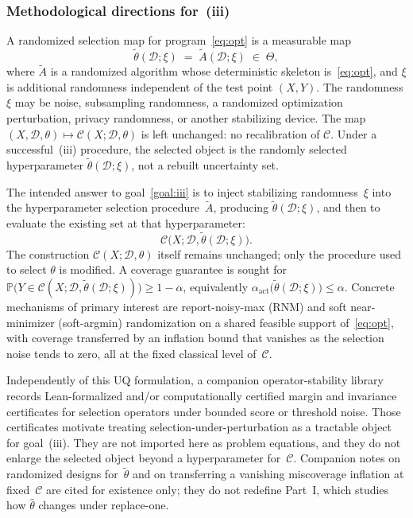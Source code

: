 \documentclass[12pt]{article}
\theoremstyle{plain}
\begin{document}
\subsubsection{Methodological directions for~(iii)}
\label{sec:methods}

\label{def:thetatilde}
A randomized selection map for program~\eqref{eq:opt} is a measurable map
\[
\widetilde\theta(\mathcal{D};\xi)
\;=\;
\widetilde A(\mathcal{D};\xi)
\;\in\;
\Theta,
\]
where $\widetilde A$ is a randomized algorithm whose deterministic skeleton is~\eqref{eq:opt}, and $\xi$ is additional randomness independent of the test point $(X,Y)$.
The randomness $\xi$ may be noise, subsampling randomness, a randomized optimization perturbation, privacy randomness, or another stabilizing device.
The map $(X,\mathcal{D},\theta)\mapsto\mathcal{C}(X;\mathcal{D},\theta)$ is left unchanged: no recalibration of $\mathcal{C}$.
Under a successful~(iii) procedure, the selected object is the randomly selected hyperparameter $\widetilde\theta(\mathcal{D};\xi)$, not a rebuilt uncertainty set.

The intended answer to goal~\ref{goal:iii} is to inject stabilizing randomness~$\xi$ into the hyperparameter selection procedure~$\widetilde A$, producing $\widetilde\theta(\mathcal{D};\xi)$, and then to evaluate the existing set at that hyperparameter:
\[
\mathcal{C}\bigl(X;\mathcal{D},\widetilde\theta(\mathcal{D};\xi)\bigr).
\]
The construction $\mathcal{C}(X;\mathcal{D},\theta)$ itself remains unchanged; only the procedure used to select $\theta$ is modified.
A coverage guarantee is sought for
$\mathbb{P}\bigl(Y\in\mathcal{C}(X;\mathcal{D},\widetilde\theta(\mathcal{D};\xi))\bigr)\ge 1-\alpha$,
equivalently $\alpha_{\mathrm{act}}\bigl(\widetilde\theta(\mathcal{D};\xi)\bigr)\le\alpha$.
Concrete mechanisms of primary interest are report-noisy-max (RNM) and soft near-minimizer (soft-argmin) randomization on a shared feasible support of~\eqref{eq:opt}, with coverage transferred by an inflation bound that vanishes as the selection noise tends to zero, all at the fixed classical level of~$\mathcal{C}$.

Independently of this UQ formulation, a companion operator-stability library records Lean-formalized and/or computationally certified margin and invariance certificates for selection operators under bounded score or threshold noise.
Those certificates motivate treating selection-under-perturbation as a tractable object for goal~(iii).
They are not imported here as problem equations, and they do not enlarge the selected object beyond a hyperparameter for~$\mathcal{C}$.
Companion notes on randomized designs for~$\widetilde\theta$ and on transferring a vanishing miscoverage inflation at fixed~$\mathcal{C}$ are cited for existence only; they do not redefine Part~I, which studies how $\hat\theta$ changes under replace-one.
\end{document}
